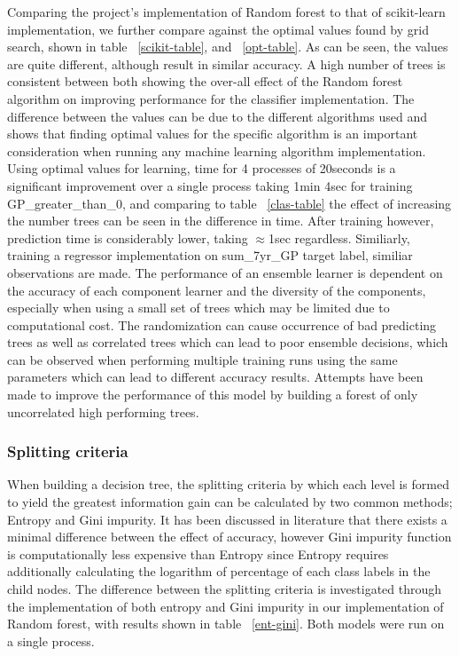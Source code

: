 \documentclass{article} %
\begin{document}
Comparing the project's implementation of Random forest to that of scikit-learn implementation, we further compare against the optimal values found by grid search, shown in table ~\ref{scikit-table}, and ~\ref{opt-table}. As can be seen, the values are quite different, although result in similar accuracy. A high number of trees is consistent between both showing the over-all effect of the Random forest algorithm on improving performance for the classifier implementation. The difference between the values can be due to the different algorithms used and shows that finding optimal values for the specific algorithm is an important consideration when running any machine learning algorithm implementation. Using optimal values for learning, time for 4 processes of 20seconds is a significant improvement over a single process taking 1min 4sec for training GP\_greater\_than\_0, and comparing to table ~\ref{clas-table} the effect of increasing the number trees can be seen in the difference in time. After training however, prediction time is considerably lower, taking $\approx$1sec regardless. Similiarly, training a regressor implementation on sum\_7yr\_GP target label, similiar observations are made. The performance of an ensemble learner is dependent on the accuracy of each component learner and the diversity of the components, especially when using a small set of trees which may be limited due to computational cost. The randomization can cause occurrence of bad predicting trees as well as correlated trees which can lead to poor ensemble decisions, which can be observed when performing multiple training runs using the same parameters which can lead to different accuracy results. Attempts have been made to improve the performance of this model by building a forest of only uncorrelated high performing trees. \cite{Bharathidason2014}

\subsubsection{Splitting criteria}

When building a decision tree, the splitting criteria by which each level is formed to yield the greatest information gain can be calculated by two common methods; Entropy and Gini impurity. It has been discussed in literature that there exists a minimal difference between the effect of accuracy, however Gini impurity function is computationally less expensive than Entropy since Entropy requires additionally calculating the logarithm of percentage of each class labels in the child nodes. The difference between the splitting criteria is investigated through the implementation of both entropy and Gini impurity in our implementation of Random forest, with results shown in table ~\ref{ent-gini}. Both models were run on a single process.
\end{document}
